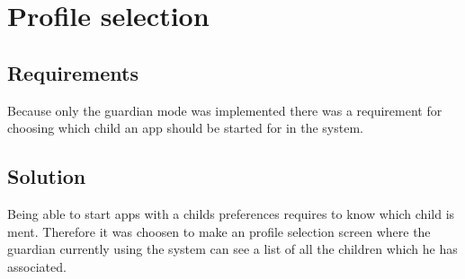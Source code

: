 \section{Profile selection}
\label{design:profile_selection}
\subsection{Requirements}
Because only the guardian mode was implemented there was a requirement for choosing which child an app should be started for in the \giraf[] system.
\subsection{Solution}
Being able to start \giraf[] apps with a childs preferences requires to know which child is ment. Therefore it was choosen to make an profile selection screen where the guardian currently using the \giraf[] system can see a list of all the children which he has associated.